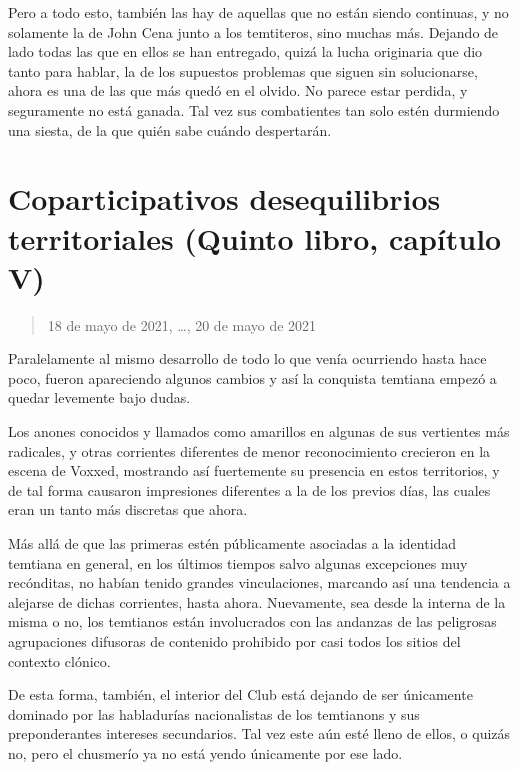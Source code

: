 \documentclass[
  spanish,
]{book}
\begin{document}
Pero a todo esto, también las hay de aquellas que no están siendo continuas, y no solamente la de John Cena junto a los temtiteros, sino muchas más. Dejando de lado todas las que en ellos se han entregado, quizá la lucha originaria que dio tanto para hablar, la de los supuestos problemas que siguen sin solucionarse, ahora es una de las que más quedó en el olvido. No parece estar perdida, y seguramente no está ganada. Tal vez sus combatientes tan solo estén durmiendo una siesta, de la que quién sabe cuándo despertarán.

\hypertarget{coparticipativos-desequilibrios-territoriales-quinto-libro-capuxedtulo-v}{%
\section{Coparticipativos desequilibrios territoriales (Quinto libro, capítulo V)}\label{coparticipativos-desequilibrios-territoriales-quinto-libro-capuxedtulo-v}}

\begin{quote}
18 de mayo de 2021, \ldots, 20 de mayo de 2021
\end{quote}

Paralelamente al mismo desarrollo de todo lo que venía ocurriendo hasta hace poco, fueron apareciendo algunos cambios y así la conquista temtiana empezó a quedar levemente bajo dudas.

Los anones conocidos y llamados como amarillos en algunas de sus vertientes más radicales, y otras corrientes diferentes de menor reconocimiento crecieron en la escena de Voxxed, mostrando así fuertemente su presencia en estos territorios, y de tal forma causaron impresiones diferentes a la de los previos días, las cuales eran un tanto más discretas que ahora.

Más allá de que las primeras estén públicamente asociadas a la identidad temtiana en general, en los últimos tiempos salvo algunas excepciones muy recónditas, no habían tenido grandes vinculaciones, marcando así una tendencia a alejarse de dichas corrientes, hasta ahora. Nuevamente, sea desde la interna de la misma o no, los temtianos están involucrados con las andanzas de las peligrosas agrupaciones difusoras de contenido prohibido por casi todos los sitios del contexto clónico.

De esta forma, también, el interior del Club está dejando de ser únicamente dominado por las habladurías nacionalistas de los temtianons y sus preponderantes intereses secundarios. Tal vez este aún esté lleno de ellos, o quizás no, pero el chusmerío ya no está yendo únicamente por ese lado.
\end{document}
